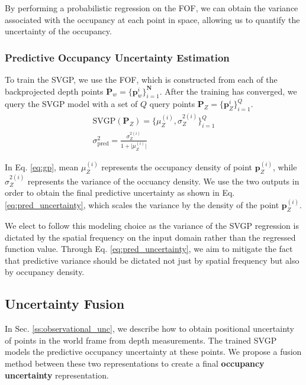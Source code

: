 By performing a probabilistic regression on the FOF, we can obtain the variance associated with the occupancy at each point in space, allowing us to quantify the uncertainty of the occupancy.


\subsubsection{Predictive Occupancy Uncertainty Estimation}
To train the SVGP, we use the FOF, which is constructed from each of the backprojected depth points $\mathbf{P}_w = \{\mathbf{p}_w^i\}_{i=1}^{\mathbf{N}}$.
After the training has converged, we query the SVGP model with a set of $Q$ query points $\mathbf{P}_Z = \{\mathbf{p}_Z^i\}_{i=1}^Q$. 
\begin{gather}
    \text{SVGP}(\mathbf{P}_Z) = \{\mu_Z^{(i)}, \sigma_Z^{2(i)}\}_{i=1}^Q \label{eq:gp} \\
    \sigma_{\text{pred}}^2 = \frac{\sigma_Z^{2(i)}}{1 + \lvert\mu_Z^{(i)}\rvert} \label{eq:pred_uncertainty}
\end{gather}

\noindent In Eq. \eqref{eq:gp}, mean $\mu_Z^{(i)}$ represents the occupancy density of point $\mathbf{p}_Z^{(i)}$, while $\sigma_Z^{2(i)}$ represents the variance of the occuancy density.
We use the two outputs in order to obtain the final predictive uncertainty as shown in Eq. \eqref{eq:pred_uncertainty}, which scales the variance by the density of the point $\mathbf{p}_Z^{(i)}$.

We elect to follow this modeling choice as the variance of the SVGP regression is dictated by the spatial frequency on the input domain rather than the regressed function value.
Through Eq. \eqref{eq:pred_uncertainty}, we aim to mitigate the fact that predictive variance should be dictated not just by spatial frequency but also by occupancy density.


\subsection{Uncertainty Fusion}\label{ss:unc_fusion}
In Sec. \ref{ss:observational_unc}, we describe how to obtain positional uncertainty of points in the world frame from depth measurements.
The trained SVGP models the predictive occupancy uncertainty at these points.
We propose a fusion method between these two representations to create a final \textbf{occupancy uncertainty} representation.

